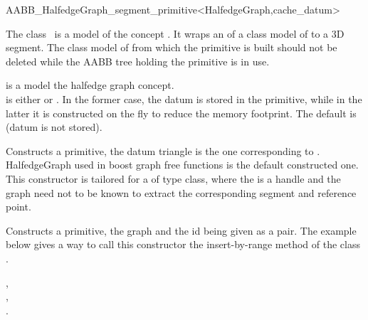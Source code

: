 \ccRefPageBegin

\begin{ccRefClass}{AABB_HalfedgeGraph_segment_primitive<HalfedgeGraph,cache_datum>}

\ccDefinition
  
The class \ccRefName\ is a model of the concept .
It wraps an  of a class model of  to a 3D segment.
The class model of  from which the primitive is built should not be deleted
while the AABB tree holding the primitive is in use.



\ccParameters
{} is a model the halfedge graph concept.\\
 is either  or . In the former case, the datum is stored in the primitive, while in the latter it is constructed on the fly to reduce
the memory footprint. The default is  (datum is not stored).


\ccTypes
{}
\ccGlue
{}
\ccGlue
{}

\ccCreation
{}

{Constructs a primitive, the datum triangle is the one corresponding to .
HalfedgeGraph used in boost graph free functions is the default constructed one. This constructor is tailored for a 
of type  class, where the  is a handle and the graph need not to be known to extract
the corresponding segment and reference point.}

{Constructs a primitive, the graph and the id being given as a pair. The example below gives a way to call this constructor the insert-by-range method of the class .}


\ccSeeAlso

,\\
,\\
.\\


\end{ccRefClass}

\ccRefPageEnd
